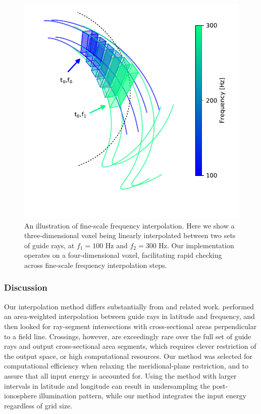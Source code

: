 \begin{figure}[h!]
\begin{center}
\includegraphics{figures/delaunay_2.pdf}
\caption[Fine-scale frequency interpolation]{An illustration of fine-scale frequency interpolation. Here we show a three-dimensional voxel being linearly interpolated between two sets of guide rays, at $f_1=100$ Hz and $f_2=300$ Hz. Our implementation operates on a four-dimensional voxel, facilitating rapid checking across fine-scale frequency interpolation steps.}
\label{fig:delaunay_2}
\end{center}
\end{figure}

\subsubsection{Discussion}
Our interpolation method differs substantially from \cite{Bortnik2005} and related work. \citeauthor{Bortnik2005} performed an area-weighted interpolation between guide rays in latitude and frequency, and then looked for ray-segment intersections with cross-sectional areas perpendicular to a field line. Crossings, however, are exceedingly rare over the full set of guide rays and output cross-sectional area segments, which requires clever restriction of the output space, or high computational resources. Our method was selected for computational efficiency when relaxing the meridional-plane restriction, and to assure that all input energy is accounted for. Using the \cite{Bortnik2005} method with larger intervals in latitude and longitude can result in undersampling the post-ionosphere illumination pattern, while our method integrates the input energy regardless of grid size.

